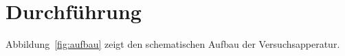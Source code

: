 \section{Durchführung}
\label{sec:durchführung}

Abbildung~\ref{fig:aufbau} zeigt den schematischen Aufbau der Versuchsapperatur.
